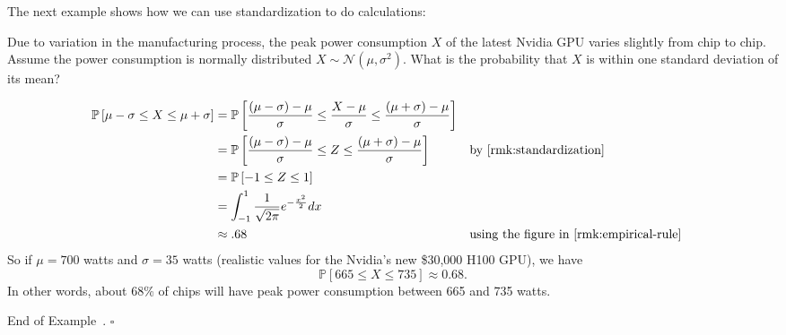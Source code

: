 \documentclass[10pt]{article}
\theoremstyle{definition}
\newtheorem{example}[theorem]{Example}
\renewenvironment{example}
{\begin{oldexample}}
  {\par\smallskip\hfill   End of Example~\theexample. $\square$    \par\end{oldexample}}
\newcommand{\vt}{\vskip 5mm} %
\newcommand{\Fl}{\vt\noindent\textbf} %
\newcommand{\1}[1]{\textbf{1}_{\left[#1\right]}} %
\def\P{\mathbb{P}} %
\newcommand{\dempfcolor}[1]{{\color{RoyalBlue}#1}}
\newcommand{\demph}[1]{\dempfcolor{{\sl \textbf{#1}}}}
\begin{document}







The next example shows how we can use standardization to do calculations:

\begin{example}
  Due to variation in the manufacturing process, the peak power consumption $X$ of
  the latest Nvidia GPU varies slightly from chip to chip. Assume the power
  consumption is normally distributed $X\sim \mathcal{N}(\mu,\sigma^{2})$. What
  is the probability that $X$ is within one standard deviation of its mean?

  \begin{align*}
    \P\left[\mu-\sigma \leq X \leq \mu+\sigma\right]
    &= \P\left[ \frac{(\mu-\sigma)-\mu}{\sigma}\leq \frac{X-\mu}{\sigma} \leq \frac{(\mu+\sigma)-\mu}{\sigma}\right]\\
    &= \P\left[ \frac{(\mu-\sigma)-\mu}{\sigma}\leq Z \leq
      \frac{(\mu+\sigma)-\mu}{\sigma}\right] &&\text{by \cref{rmk:standardization} }\\
    &= \P\left[-1 \leq Z \leq 1\right]\\
    &= \int_{-1}^{1}\frac{1}{\sqrt{2 \pi}} e^{-\frac{x^{2}}{2}}dx\\
    &\approx .68 &&\text{using the figure in \cref{rmk:empirical-rule}}
  \end{align*}
  So if $\mu=700$ watts and $\sigma= 35$ watts (realistic values for the
  Nvidia's new \$30,000 H100 GPU), we have
  \begin{equation*}
    \P\left[665 \leq X \leq 735\right]\approx 0.68.
  \end{equation*}
  In other words, about 68\% of chips will have peak power consumption between
  665 and 735 watts.
\end{example}
\end{document}
